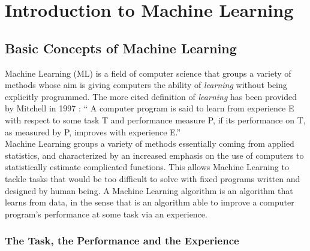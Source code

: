 
\chapter{Introduction to Machine Learning} %

\label{ChapterIntroML}


\section{Basic Concepts of Machine Learning}
Machine Learning (ML) is a field of computer science that groups a variety of  methods whose aim is giving computers the ability of \emph{learning} without being explicitly programmed. The more cited definition of \emph{learning} has been provided by Mitchell in 1997 \cite{Mitchell1997}: \enquote{ A computer program is said to learn from experience E with respect to some task T and performance measure P, if its performance on T, as measured by P, improves with experience E.} \\
Machine Learning groups a variety of methods essentially coming from applied statistics, and characterized by an increased emphasis on the use of computers to statistically estimate complicated functions. This allows Machine Learning to tackle tasks that would be too difficult to solve with fixed programs written and designed by human being. A Machine Learning algorithm is an algorithm that learns from data, in the sense that is an algorithm able to improve a computer program's performance at some task via an experience.

\subsection{The Task, the Performance and the Experience}
